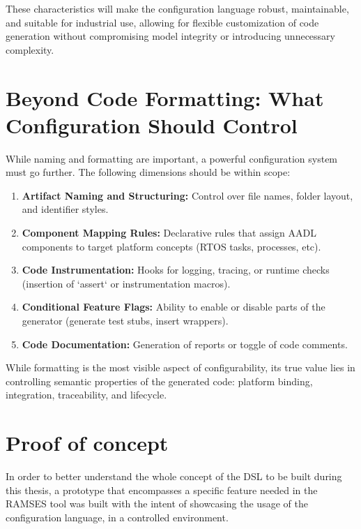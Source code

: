 These characteristics will make the configuration language robust, maintainable, and suitable for industrial use, allowing for flexible customization of code generation without compromising model integrity or introducing unnecessary complexity.

\section{Beyond Code Formatting: What Configuration Should Control}
\label{sec:config_scope}

While naming and formatting are important, a powerful configuration system must go further. The following dimensions should be within scope:

\begin{enumerate}
	\item \textbf{Artifact Naming and Structuring:} Control over file names, folder layout, and \gls{identifier} styles.
	\item \textbf{Component Mapping Rules:} Declarative rules that assign \gls{AADL} components to target platform concepts (RTOS tasks, processes, etc).
	\item \textbf{Code Instrumentation:} Hooks for logging, tracing, or runtime checks (insertion of `assert` or instrumentation macros).
	\item \textbf{Conditional Feature Flags:} Ability to enable or disable parts of the generator (generate test stubs, insert wrappers).
	\item \textbf{Code Documentation:} Generation of reports or toggle of code comments.
\end{enumerate}

\begin{tcolorbox}[colback=blue!5, colframe=blue!50!black, title=Configuration is More Than Style]
	While formatting is the most visible aspect of configurability, its true value lies in controlling semantic properties of the generated code: platform binding, integration, traceability, and lifecycle.
\end{tcolorbox}

\section{Proof of concept}
\label{sec:proof_of_concept}

In order to better understand the whole concept of the \gls{DSL} to be built during this thesis, a prototype that encompasses a specific feature needed in the \gls{RAMSES} tool was built with the intent of showcasing the usage of the configuration language, in a controlled environment.

